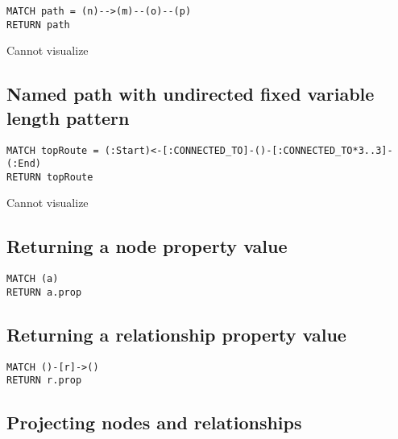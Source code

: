 \begin{lstlisting}
MATCH path = (n)-->(m)--(o)--(p)
RETURN path
\end{lstlisting}

Cannot visualize
\subsection{Named path with undirected fixed variable length pattern}

\begin{lstlisting}
MATCH topRoute = (:Start)<-[:CONNECTED_TO]-()-[:CONNECTED_TO*3..3]-(:End)
RETURN topRoute
\end{lstlisting}

Cannot visualize
\subsection{Returning a node property value}

\begin{lstlisting}
MATCH (a)
RETURN a.prop
\end{lstlisting}

\subsection{Returning a relationship property value}

\begin{lstlisting}
MATCH ()-[r]->()
RETURN r.prop
\end{lstlisting}

\subsection{Projecting nodes and relationships}

